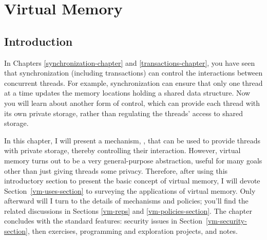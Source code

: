 \chapter{Virtual Memory}\label{vm-chapter}

\section{Introduction}
\label{vm-intro-section}

In Chapters \ref{synchronization-chapter} and \ref{transactions-chapter}, you have seen that synchronization
(including transactions) can control the interactions between
concurrent threads.  For example, synchronization can ensure that only
one thread at a time updates the memory locations holding a shared
data structure.  Now you will learn about another
form of control, which can provide each thread with its own private storage, rather than regulating the threads' access to shared
storage.

In this chapter, I will present a mechanism, ,
that can be used to provide threads with private storage, thereby
controlling their interaction.  However, virtual memory turns out to
be a very general-purpose abstraction, useful for many goals other
than just giving threads some privacy.  Therefore, after using this
introductory section to present the basic concept of virtual memory,
I will devote Section~\ref{vm-uses-section} to surveying the applications of virtual
memory.  Only afterward will I turn to the details of mechanisms and
policies; you'll find the related discussions in Sections \ref{vm-reps} and \ref{vm-policies-section}.  The
chapter concludes with the standard features: security issues in
Section~\ref{vm-security-section}, then exercises, programming and
exploration projects, and notes. 

